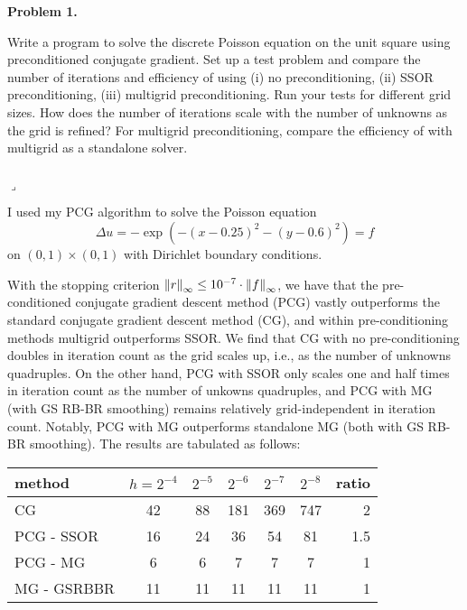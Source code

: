\documentclass[12pt]{article}
\newenvironment{myprob}[1]
    {%
    \noindent{\Huge$\ulcorner$}\textbf{#1.}\begin{em}
    }
    { 
    \end{em} \\ \hphantom{l} \hfill {\Huge$\lrcorner$} }
\begin{document}
\rhead{\today}

{\let\newpage\relax} 


\begin{myprob}{Problem 1}
Write a program to solve the discrete Poisson equation on the unit square using preconditioned conjugate gradient. Set up a test problem and compare the number of iterations and efficiency of using (i) no preconditioning, (ii) SSOR preconditioning, (iii) multigrid preconditioning. Run your tests for different grid sizes. How does the number of iterations scale with the number of unknowns as the grid is refined? For multigrid preconditioning, compare the efficiency of with multigrid as a standalone solver.
\end{myprob}

I used my PCG algorithm to solve the Poisson equation 
$$\Delta u = -\exp (-(x-0.25)^2 - (y-0.6)^2) = f$$
on $(0,1) \times (0,1)$ with Dirichlet boundary conditions.

With the stopping criterion $\norm{r}_\infty \leq 10^{-7} \cdot \norm{f}_\infty$,
we have that the pre-conditioned conjugate gradient descent method (PCG) vastly outperforms the standard conjugate gradient descent method (CG), and within pre-conditioning methods multigrid outperforms SSOR.  We find that CG with no pre-conditioning doubles in iteration count as the grid scales up, i.e., as the number of unknowns quadruples. On the other hand, PCG with SSOR only scales one and half times in iteration count as the number of unkowns quadruples, and PCG with MG (with GS RB-BR smoothing) remains relatively grid-independent in iteration count. Notably, PCG with MG outperforms standalone MG (both with GS RB-BR smoothing). The results are tabulated as follows:
\begin{center}
\begin{tabular}{||l|ccccc|r||}
\hline \hline
  method & $h = 2^{-4}$ & $2^{-5}$ & $2^{-6}$ & $2^{-7}$ & $2^{-8}$ & ratio \\
  \hline \hline
  CG  & 42 & 88 & 181 & 369 & 747 & 2 \\
  PCG - SSOR & 16 & 24 & 36 & 54 & 81 & 1.5 \\
  PCG - MG & 6 & 6 & 7 & 7 & 7 & 1 \\
  MG - GSRBBR & 11 & 11 & 11 & 11 & 11 & 1 \\
  \hline \hline
\end{tabular}
\end{center}
\end{document}
